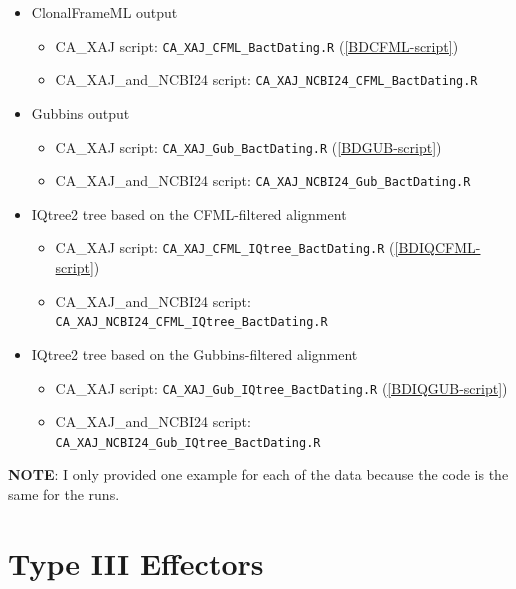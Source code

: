 \documentclass[
]{book}
\providecommand{\tightlist}{%
  \setlength{\itemsep}{0pt}\setlength{\parskip}{0pt}}
\begin{document}
\begin{itemize}
\tightlist
\item
  ClonalFrameML output

  \begin{itemize}
  \tightlist
  \item
    CA\_XAJ script: \texttt{CA\_XAJ\_CFML\_BactDating.R} (\ref{BDCFML-script})
  \item
    CA\_XAJ\_and\_NCBI24 script: \texttt{CA\_XAJ\_NCBI24\_CFML\_BactDating.R}
  \end{itemize}
\item
  Gubbins output

  \begin{itemize}
  \tightlist
  \item
    CA\_XAJ script: \texttt{CA\_XAJ\_Gub\_BactDating.R} (\ref{BDGUB-script})
  \item
    CA\_XAJ\_and\_NCBI24 script: \texttt{CA\_XAJ\_NCBI24\_Gub\_BactDating.R}
  \end{itemize}
\item
  IQtree2 tree based on the CFML-filtered alignment

  \begin{itemize}
  \tightlist
  \item
    CA\_XAJ script: \texttt{CA\_XAJ\_CFML\_IQtree\_BactDating.R} (\ref{BDIQCFML-script})
  \item
    CA\_XAJ\_and\_NCBI24 script: \texttt{CA\_XAJ\_NCBI24\_CFML\_IQtree\_BactDating.R}
  \end{itemize}
\item
  IQtree2 tree based on the Gubbins-filtered alignment

  \begin{itemize}
  \tightlist
  \item
    CA\_XAJ script: \texttt{CA\_XAJ\_Gub\_IQtree\_BactDating.R} (\ref{BDIQGUB-script})
  \item
    CA\_XAJ\_and\_NCBI24 script: \texttt{CA\_XAJ\_NCBI24\_Gub\_IQtree\_BactDating.R}
  \end{itemize}
\end{itemize}

\textbf{NOTE}: I only provided one example for each of the data because the code is the same for the runs.

\section{Type III Effectors}\label{T3EMeth}
\end{document}

